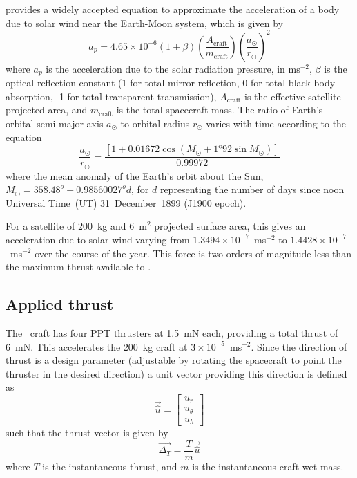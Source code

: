 \textcite[p. 223]{Chobotov2002} provides a widely accepted equation to approximate the acceleration
 of a body due to solar wind near the Earth-Moon system, which is given by 
\begin{equation}
a_{p}=4.65\times10^{-6}(1+\beta)\left(\frac{A_{\text{craft}}}{m_{\text{craft}}}\right)\left(\frac{a_{\odot}}{r_{\odot}}\right)^{2}\label{eq:solar-wind}
\end{equation}
where $a_{p}$ is the acceleration due to the solar radiation pressure, in $\text{ms}^{-2}$, $\beta$ is the optical reflection constant (1 for total mirror reflection, 0 for total black body absorption, -1 for total transparent transmission), $A_{\text{craft}}$ is the effective satellite projected area, and $m_{\text{craft}}$ is the total spacecraft mass. The ratio of Earth's orbital semi-major axis $a_{\odot}$ to orbital radius $r_{\odot}$ varies with time according to the equation 
\begin{equation}
\frac{a_{\odot}}{r_{\odot}}=\frac{[1+0.01672\cos(M_{\odot}+1º92\sin M_{\odot})]}{0.99972}\label{eq:a_sun/r_sun}
\end{equation}
where the mean anomaly of the Earth's orbit about the Sun, $M_{\odot}=358.48^{o}+0.98560027^{o}d$, for $d$ representing the number of days since noon Universal Time~(UT) 31~December~1899 (J1900 epoch).

For a satellite of 200~kg and 6~m$^2$ projected surface area, this gives an acceleration due to solar wind varying from $1.3494\times10^{-7}$~ms$^{-2}$ to $1.4428\times10^{-7}$~ms$^{-2}$ over the course of the year. This force is two orders of magnitude less than the maximum thrust available to \BW.




\subsection{Applied thrust} \label{sub:Applied-Thrust}

The \BW\ craft has four PPT thrusters at 1.5~mN each, providing a total thrust of 6~mN. This accelerates the 200~kg craft at $3\times10^{-5}$~ms$^{-2}$. Since the direction of thrust is a design parameter (adjustable by rotating the spacecraft to point the thruster in the desired direction) a unit vector providing this direction is defined as
\begin{equation}
\vec{\hat{u}}=\left[\begin{array}{c}
u_{r}\\
u_{\theta}\\
u_{h}
\end{array}\right]
\label{eq:thrust-vector}
\end{equation}
such that the thrust vector is given by 
\begin{equation}
\vec{\Delta_{T}}=\frac{T}{m}\vec{\hat{u}} \label{eq:thrust-perturbation}
\end{equation}
where $T$ is the instantaneous thrust, and $m$ is the instantaneous craft wet mass.


